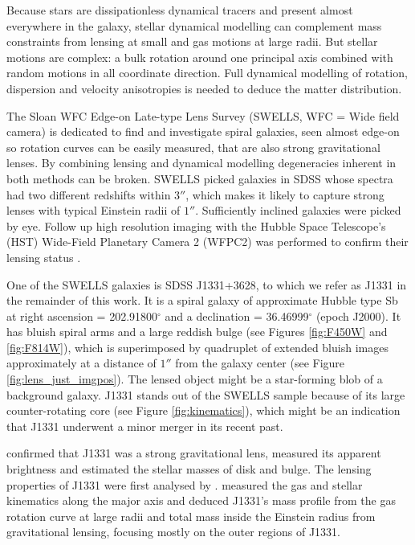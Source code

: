 Because stars are dissipationless dynamical tracers and present almost everywhere in the galaxy, stellar dynamical modelling can complement mass constraints from lensing at small and gas motions at large radii. But stellar motions are complex: a bulk rotation around one principal axis combined with random motions in all coordinate direction. Full dynamical modelling of rotation, dispersion and velocity anisotropies is needed to deduce the matter distribution.

The Sloan WFC Edge-on Late-type Lens Survey (SWELLS, WFC = Wide field camera) \citep{SWELLSI,SWELLSII,SWELLSIII,SWELLSIV,SWELLSV,SWELLSVI} is dedicated to find and investigate spiral galaxies, seen almost edge-on so rotation curves can be easily measured, that are also strong gravitational lenses. By combining lensing and dynamical modelling degeneracies inherent in both methods can be broken. SWELLS picked galaxies in SDSS whose spectra had two different redshifts within $3''$, which makes it likely to capture strong lenses with typical Einstein radii of $1''$. Sufficiently inclined galaxies were picked by eye. Follow up high resolution imaging with the Hubble Space Telescope's (HST) Wide-Field Planetary Camera 2 (WFPC2) was performed to confirm their lensing status \citep{SWELLSI}.

One of the SWELLS galaxies is SDSS J1331+3628, to which we refer as J1331 in the remainder of this work. It is a spiral galaxy of approximate Hubble type Sb at right ascension = 202.91800$^\circ$ and a declination = 36.46999$^\circ$ (epoch J2000). It has bluish spiral arms and a large reddish bulge (see Figures \ref{fig:F450W} and \ref{fig:F814W}), which is superimposed by quadruplet of extended bluish images approximately at a distance of $1''$ from the galaxy center (see Figure \ref{fig:lens_just_imgpos}). The lensed object might be a star-forming blob of a background galaxy. J1331 stands out of the SWELLS sample because of its large counter-rotating core (see Figure \ref{fig:kinematics}), which might be an indication that J1331 underwent a minor merger in its recent past.

\citet{SWELLSI} confirmed that J1331 was a strong gravitational lens, measured its apparent brightness and estimated the stellar masses of disk and bulge. The lensing properties of J1331 were first analysed by \citet{SWELLSIII}. \citet{SWELLSV} measured the gas and stellar kinematics along the major axis and deduced J1331's mass profile from the gas rotation curve at large radii and total mass inside the Einstein radius from gravitational lensing, focusing mostly on the outer regions of J1331.

